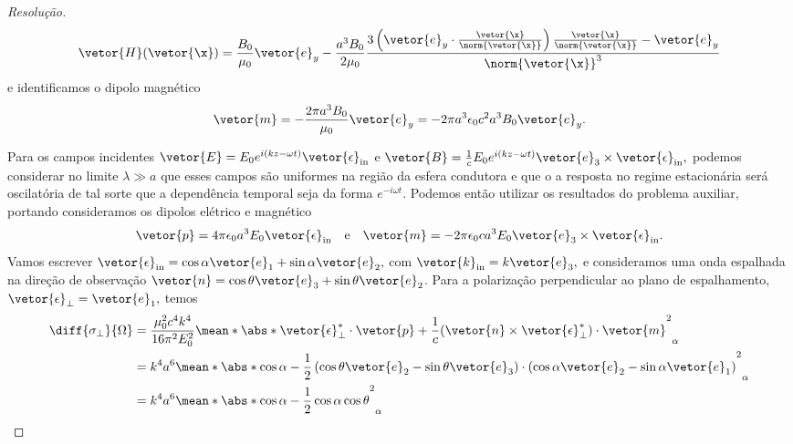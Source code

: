 \begin{proof}[Resolução]
   \begin{equation*}
   \vetor{H}(\vetor{\x}) = \frac{B_0}{\mu_0}\vetor{e}_y - \frac{a^3 B_0}{2\mu_0}\frac{3\left(\vetor{e}_y \cdot \frac{\vetor{\x}}{\norm{\vetor{\x}}}\right)\frac{\vetor{\x}}{\norm{\vetor{\x}}}-\vetor{e}_y}{\norm{\vetor{\x}}^3} 
   \end{equation*}
   e identificamos o dipolo magnético
   \begin{equation*}
      \vetor{m} = - \frac{2\pi a^3 B_0}{\mu_0}\vetor{e}_y = - 2\pi a^3 \epsilon_0 c^2 a^3 B_0 \vetor{e}_y.
   \end{equation*}

   Para os campos incidentes \(\vetor{E} = E_0 e^{i(kz - \omega t)} \vetor{\epsilon}_\mathrm{in}\) e \(\vetor{B} = \frac{1}{c} E_0 e^{i(k z - \omega t)} \vetor{e}_3 \times \vetor{\epsilon}_{\mathrm{in}},\) podemos considerar no limite \(\lambda \gg a\) que esses campos são uniformes na região da esfera condutora e que o a resposta no regime estacionária será oscilatória de tal sorte que a dependência temporal seja da forma \(e^{-i \omega t}.\) Podemos então utilizar os resultados do problema auxiliar, portando consideramos os dipolos elétrico e magnético
   \begin{equation*}
      \vetor{p} = 4\pi \epsilon_0 a^3 E_0 \vetor{\epsilon}_{\mathrm{in}}\quad\text{e}\quad
      \vetor{m} = - 2\pi \epsilon_0 ca^3 E_0 \vetor{e}_3 \times \vetor{\epsilon}_\mathrm{in}.
   \end{equation*}
   Vamos escrever \(\vetor{\epsilon}_{\mathrm{in}} = \cos \alpha \vetor{e}_1 + \sin \alpha \vetor{e}_2,\) com \(\vetor{k}_{\mathrm{in}} = k \vetor{e}_3,\) e consideramos uma onda espalhada na direção de observação \(\vetor{n} = \cos\theta \vetor{e}_3 + \sin\theta \vetor{e}_2\). Para a polarização perpendicular ao plano de espalhamento, \(\vetor{\epsilon}_{\perp} = \vetor{e}_1,\) temos
   \begin{align*}
      \diff{\sigma_{\perp}}{\Omega} &= \frac{\mu_0^2 c^4 k^4}{16 \pi^2 E_0^2}\mean*{\abs*{\vetor{\epsilon}_{\perp}^* \cdot \vetor{p} + \frac1c (\vetor{n} \times \vetor{\epsilon}_{\perp}^*)\cdot \vetor{m}}^2}_{\alpha}\\
                                    &= k^4 a^6 \mean*{\abs*{\cos \alpha - \frac12 \left(\cos\theta \vetor{e}_2 - \sin\theta \vetor{e}_3\right)\cdot\left(\cos \alpha \vetor{e}_2 - \sin\alpha \vetor{e}_1\right)}^2}_\alpha\\
                                    &= k^4 a^6 \mean*{\abs*{\cos \alpha - \frac12 \cos \alpha \cos\theta}^2}_\alpha\\

\end{align*}
\end{proof}

